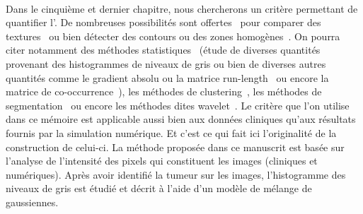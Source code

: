 \documentclass[main.tex]{subfiles}
\begin{document}
\paragraph{}
Dans le cinquième et dernier chapitre, nous chercherons un critère permettant de quantifier l'\hetero.  %
De nombreuses possibilités sont offertes~\cite{materka1998texture,davnall2012assessment,castellano2004texture} pour comparer des textures~\cite{chabat2003obstructive,napel2010automated} ou bien détecter des contours ou des zones homogènes~\cite{pal1993review}. On pourra citer notamment des méthodes statistiques~\cite{haralick1979statistical} (étude de diverses quantités provenant des histogrammes de niveaux de gris ou bien de diverses autres quantités comme le gradient absolu ou la matrice run-length~\cite{galloway1975texture,chu1990use,xu2004run} ou encore la matrice de co-occurrence~\cite{ahmed2013texture}), les méthodes de clustering~\cite{longo2015cluster}, les méthodes de segmentation~\cite{hatt2009fuzzy,hatt2010accurate} ou encore les méthodes dites  wavelet~\cite{davnall2012assessment,morris2006using}.
Le critère que l'on utilise dans ce mémoire est 
applicable aussi bien aux données cliniques qu'aux résultats fournis par la simulation numérique. 
Et c'est ce qui fait ici l'originalité de la construction de celui-ci. %
La méthode proposée dans ce manuscrit est basée sur l'analyse %
de l'intensité des pixels 
qui constituent les images (cliniques et numériques). 
Après avoir identifié la tumeur sur les images, l'histogramme des niveaux de gris est étudié et décrit à l'aide 
d'un modèle de mélange de gaussiennes. 
\end{document}
